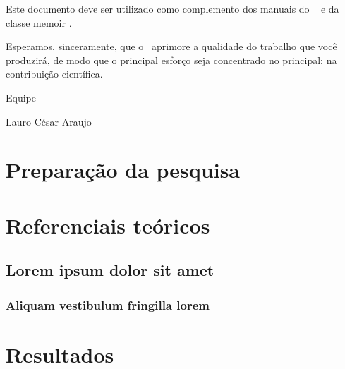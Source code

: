 \documentclass[12pt,openright,twoside,a4paper,
english,french,spanish,brazil]{abntex2}
\begin{document}
		Este documento deve ser utilizado como complemento dos manuais do \abnTeX\ 
		\cite{abntex2classe,abntex2cite,abntex2cite-alf} e da classe \textsf{memoir}
		\cite{memoir}. 
		
		Esperamos, sinceramente, que o \abnTeX\ aprimore a qualidade do trabalho que
		você produzirá, de modo que o principal esforço seja concentrado no principal:
		na contribuição científica.
		
		Equipe \abnTeX 
		
		Lauro César Araujo
		
		\part{Preparação da pesquisa}
		
		
		
		\part{Referenciais teóricos}
		
		\chapter{Lorem ipsum dolor sit amet}
		
		\section{Aliquam vestibulum fringilla lorem}
		
		\lipsum[1]
		
		\lipsum[2-3]
		
		\part{Resultados}
		
\end{document}
